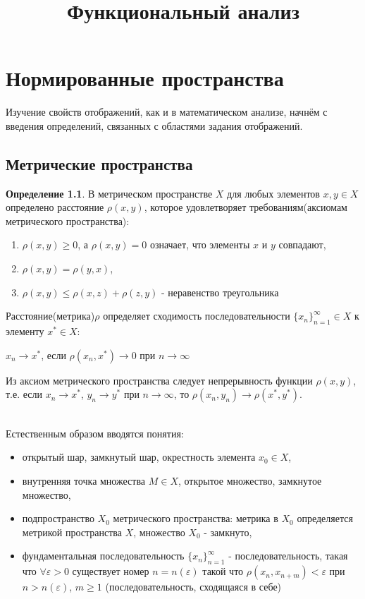 \documentclass[12pt,a4paper,titlepage]{book}
\title{Функциональный анализ}
\theoremstyle{definition}
\newtheorem{definition}{Определение}
\theoremstyle{plain}
\theoremstyle{remark}
\theoremstyle{plain}
\begin{document}
\chapter{Нормированные пространства}

Изучение свойств отображений, как и в математическом анализе, начнём с введения определений, связанных с областями задания отображений.\\

\section{Метрические пространства}
\begin{definition}В метрическом пространстве $X$ для любых элементов $x,y\in X$ определено расстояние $\rho(x, y)$, которое удовлетворяет требованиям(аксиомам метрического пространства):
 \begin{enumerate}
 \item $\rho(x, y)\geqslant 0$, а $\rho(x, y)=0$ означает, что элементы $x$ и $y$ совпадают,
 \item $\rho(x, y)=\rho(y, x)$,
 \item $ \rho(x, y)\leqslant \rho(x, z) +\rho(z, y)$ - неравенство треугольника
 \end{enumerate} 
\end{definition}
\par Расстояние(метрика)$\rho$ определяет сходимость последовательности $\lbrace x_n \rbrace_{n=1}^{\infty}  \in X$ к элементу $x^{*}\in X$:
\begin{center}
	$x_n\rightarrow x^{*}$, если $\rho(x_n, x^{*})\rightarrow 0$ при $n\rightarrow\infty$
\end{center}
\par Из аксиом метрического пространства следует непрерывность функции $\rho(x, y)$, т.е. если $x_n\rightarrow x^{*}$, $y_n\rightarrow y^{*}$ при $n\rightarrow\infty$, то $\rho(x_n, y_n)\rightarrow \rho(x^*, y^*)$.
\\
\\
\par Естественным образом вводятся понятия:
\begin{itemize}
\item  открытый шар, замкнутый шар, окрестность элемента $x_0\in X$,
\item внутренняя точка множества $M \in X$, открытое множество, замкнутое множество,
\item подпространство $X_0$ метрического пространства: метрика в $X_0$ определяется метрикой пространства $X$, множество $X_0$ - замкнуто,
\item фундаментальная последовательность $\lbrace x_n \rbrace_{n=1}^{\infty}$ - последовательность, такая что $\forall \varepsilon>0$ существует номер $n=n(\varepsilon)$ такой что $\rho(x_n, x_{n+m})<\varepsilon$ при $n>n(\varepsilon)$, $m\geq1$ (последовательность, сходящаяся в себе)
\end{itemize}
\end{document}
